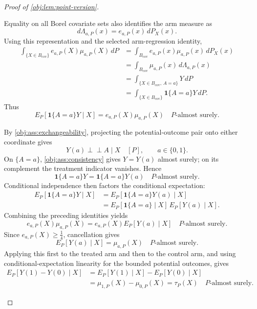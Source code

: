 \begin{proof}[Proof of \cref{obj:lem:point-version}]
\begin{enumerate}
Equality on all Borel covariate sets also identifies the arm measure as
\[
d\Lambda_{a,P}(x)=e_{a,P}(x)\,dP_X(x).
\]
Using this representation and the selected arm-regression identity,
\[
\begin{aligned}
\int_{\{X\in B_{\mathrm{cov}}\}}
e_{a,P}(X)\mu_{a,P}(X)\,dP
&=\int_{B_{\mathrm{cov}}}
e_{a,P}(x)\mu_{a,P}(x)\,dP_X(x)\\
&=\int_{B_{\mathrm{cov}}}\mu_{a,P}(x)\,d\Lambda_{a,P}(x)\\
&=\int_{\{X\in B_{\mathrm{cov}},\,A=a\}}Y\,dP\\
&=\int_{\{X\in B_{\mathrm{cov}}\}}\mathbf1\{A=a\}Y\,dP.
\end{aligned}
\]
Thus
\[
E_P[\mathbf1\{A=a\}Y\mid X]
=e_{a,P}(X)\mu_{a,P}(X)
\quad P\text{-almost surely}.
\]

By \cref{obj:ass:exchangeability}, projecting the potential-outcome pair onto either coordinate gives
\[
Y(a)\perp\!\!\!\perp A\mid X\quad[P],
\qquad a\in\{0,1\}.
\]
On \(\{A=a\}\), \cref{obj:ass:consistency} gives \(Y=Y(a)\) almost surely; on its complement the treatment indicator vanishes. Hence
\[
\mathbf1\{A=a\}Y
=\mathbf1\{A=a\}Y(a)
\quad P\text{-almost surely}.
\]
Conditional independence then factors the conditional expectation:
\[
\begin{aligned}
E_P[\mathbf1\{A=a\}Y\mid X]
&=E_P[\mathbf1\{A=a\}Y(a)\mid X]\\
&=E_P[\mathbf1\{A=a\}\mid X]\,
  E_P[Y(a)\mid X].
\end{aligned}
\]
Combining the preceding identities yields
\[
e_{a,P}(X)\mu_{a,P}(X)
=e_{a,P}(X)E_P[Y(a)\mid X]
\quad P\text{-almost surely}.
\]
Since \(e_{a,P}(X)\ge\tfrac14\), cancellation gives
\[
E_P[Y(a)\mid X]=\mu_{a,P}(X)
\quad P\text{-almost surely}.
\]
Applying this first to the treated arm and then to the control arm, and using conditional-expectation linearity for the bounded potential outcomes, gives
\[
\begin{aligned}
E_P[Y(1)-Y(0)\mid X]
&=E_P[Y(1)\mid X]-E_P[Y(0)\mid X]\\
&=\mu_{1,P}(X)-\mu_{0,P}(X)
=\tau_P(X)
\quad P\text{-almost surely}.
\end{aligned}
\] %


\end{enumerate}
\end{proof}
